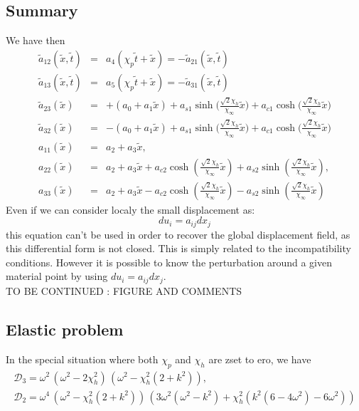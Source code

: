 \documentclass[
10pt, %
a4paper, %
oneside, %
headinclude,footinclude, %
table
]{scrartcl}
\begin{document}
\subsection{Summary}
We have then
$$
\begin{array}{rcl}
\tilde{a}_{12}(\tilde{x},\tilde{t})&=&a_{4}(\chi_{p}\tilde{t}+\tilde{x})=-\tilde{a}_{21}(\tilde{x},\tilde{t}) 	\\
\tilde{a}_{13}(\tilde{x},\tilde{t})&=&a_{5}(\chi_{p}\tilde{t}+\tilde{x})=-\tilde{a}_{31}(\tilde{x},\tilde{t})		\\
\tilde{a}_{23}(\tilde{x})&=&+(a_{0}+a_{1}\tilde{x})+a_{s1}\sinh{(\frac{\sqrt{2}\chi_{h}}{\chi_{\infty}}\tilde{x}})+a_{c1}\cosh{(\frac{\sqrt{2}\chi_{h}}{\chi_{\infty}}\tilde{x}})
\\
\tilde{a}_{32}(\tilde{x})&=&-(a_{0}+a_{1}\tilde{x})+a_{s1}\sinh{(\frac{\sqrt{2}\chi_{h}}{\chi_{\infty}}\tilde{x}})+a_{c1}\cosh{(\frac{\sqrt{2}\chi_{h}}{\chi_{\infty}}\tilde{x}}) \\
a_{11}(\tilde{x}) &=&a_{2}+a_{3} \tilde{x},
\\
a_{22}(\tilde{x}) &=&a_{2}+a_{3} \tilde{x}+a_{c2} \cosh (\frac{\sqrt{2}  \chi _h}{\chi
   _{\infty }}\tilde{x})+a_{s2} \sinh (\frac{\sqrt{2} \chi _h}{\chi _{\infty
   }}\tilde{x} ),
\\
a_{33}(\tilde{x}) &=&a_{2}+a_{3} \tilde{x}-a_{c2} \cosh (\frac{\sqrt{2}\chi _h}{\chi
   _{\infty }} \tilde{x} )-a_{s2} \sinh (\frac{\sqrt{2} \chi _h}{\chi _{\infty
   }}\tilde{x} )
\end{array}
$$
Even if we can consider localy the small displacement as:
$$
du_{i}=a_{ij}dx_{j}
$$
this equation can't be used in order to recover the global displacement field, as this differential form is not closed. This is simply related to the incompatibility conditions.
However it is possible to know the perturbation around a given material point by using $du_{i}=a_{ij}dx_{j}$. \\
TO BE CONTINUED : FIGURE AND COMMENTS

\subsection{Elastic problem}

In the special situation where both $\chi_{p}$ and $\chi_{h}$ are zset to ero, we have
$$
\begin{array}{c}
\mathcal{D}_{3}=\omega^2\, \left(\omega^2-2\chi_{h}^2\right)\, \left(\omega^2-\chi_{h}^2(2+k^2)\right), \\[6pt]
\mathcal{D}_{2}=\omega^4 \, \left(\omega^2-\chi_{h}^2(2+k^2)\right) \, \left( 
 3 \omega^2(\omega^2 - k^2)+ \chi_{h}^2( k^2 (6 - 4 \omega^2)-6 \omega^2)  \right)
 \end{array}
$$
\end{document}
